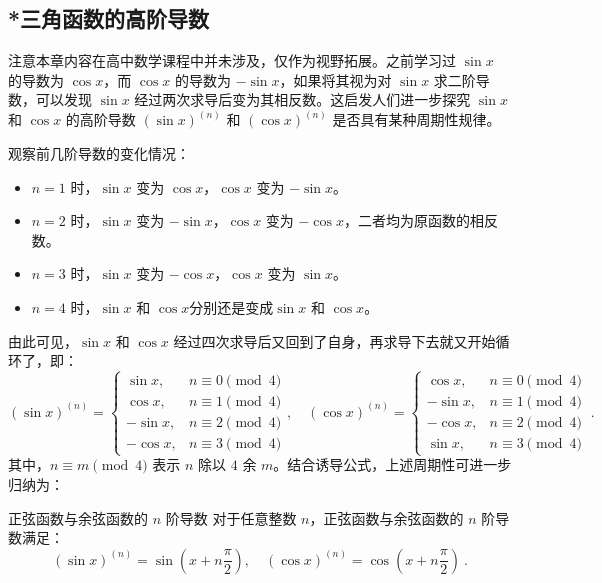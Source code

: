 \subsection{*三角函数的高阶导数}


注意本章内容在高中数学课程中并未涉及，仅作为视野拓展。之前学习过 $\sin x$ 的导数为 $\cos x$，而 $\cos x$ 的导数为 $-\sin x$，如果将其视为对 $\sin x$ 求二阶导数，可以发现 $\sin x$ 经过两次求导后变为其相反数。这启发人们进一步探究 $\sin x$ 和 $\cos x$ 的高阶导数 $(\sin x)^{(n)}$ 和 $(\cos x)^{(n)}$ 是否具有某种周期性规律。

观察前几阶导数的变化情况：
\begin{itemize}
\item $n = 1$ 时，$\sin x$ 变为 $\cos x$，$\cos x$ 变为 $-\sin x$。
\item $n = 2$ 时，$\sin x$ 变为 $-\sin x$，$\cos x$ 变为 $-\cos x$，二者均为原函数的相反数。
\item $n = 3$ 时，$\sin x$ 变为 $-\cos x$，$\cos x$ 变为 $\sin x$。
\item $n = 4$ 时，$\sin x$ 和 $\cos x$分别还是变成$\sin x$ 和 $\cos x$。
\end{itemize}
由此可见，$\sin x$ 和 $\cos x$ 经过四次求导后又回到了自身，再求导下去就又开始循环了，即：
\begin{equation}\label{eq_HsSinF_2}
(\sin x)^{(n)}  =
\begin{cases}
\sin x, & n \equiv 0 \pmod{4} \\
\cos x, & n \equiv 1 \pmod{4} \\
-\sin x, & n \equiv 2 \pmod{4} \\
-\cos x, & n \equiv 3 \pmod{4}
\end{cases},\quad(\cos x)^{(n)} =
\begin{cases}
\cos x, & n \equiv 0 \pmod{4} \\
-\sin x, & n \equiv 1 \pmod{4} \\
-\cos x, & n \equiv 2 \pmod{4} \\
\sin x, & n \equiv 3 \pmod{4}
\end{cases}~.
\end{equation}
其中，$n \equiv m \pmod{4}$ 表示 $n$ 除以 $4$ 余 $m$。结合诱导公式，上述周期性可进一步归纳为：

\begin{corollary}{正弦函数与余弦函数的 $n$ 阶导数}
对于任意整数 $n$，正弦函数与余弦函数的 $n$ 阶导数满足：
\begin{equation}
(\sin x)^{(n)} = \sin\left(x + n\frac{\pi}{2}\right), \quad
(\cos x)^{(n)} = \cos\left(x + n\frac{\pi}{2}\right)~.
\end{equation}
\end{corollary}

